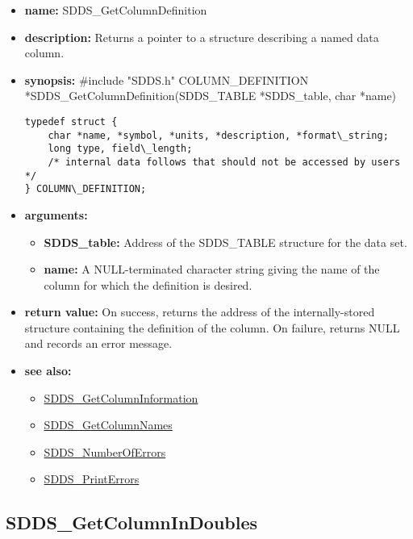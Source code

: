 \documentclass[11pt]{article}
\newcommand{\progref}[1]{\hyperref{SDDS_#1}{{\tt SDDS\_#1} (}{)}{SDDS_#1}}
\begin{document}
\begin{itemize}
\item {\bf name:}\newline
SDDS\_GetColumnDefinition
\item {\bf description:}\newline
Returns a pointer to a structure describing a named data column.
\item {\bf synopsis:} \#include "SDDS.h"\newline
COLUMN\_DEFINITION *SDDS\_GetColumnDefinition(SDDS\_TABLE *SDDS\_table, char *name)\newline
\begin{verbatim}
typedef struct {
    char *name, *symbol, *units, *description, *format\_string;
    long type, field\_length;
    /* internal data follows that should not be accessed by users */
} COLUMN\_DEFINITION;
\end{verbatim}
\item {\bf arguments:}
\begin{itemize}
\item {\bf SDDS\_table:} Address of the SDDS\_TABLE structure for the data set.
\item {\bf name:} A NULL-terminated character string giving the name of the column for which the definition is desired.
\end{itemize}
\item {\bf return value:}\newline
On success, returns the address of the internally-stored structure containing the definition of the column. On failure, returns NULL and records an error message.
\item {\bf see also:}
\begin{itemize}
\item \progref{GetColumnInformation}
\item \progref{GetColumnNames}
\item \progref{NumberOfErrors}
\item \progref{PrintErrors}
\end{itemize}
\end{itemize}

\subsection{SDDS\_GetColumnInDoubles}
\label{SDDS_GetColumnInDoubles}
\end{document}
